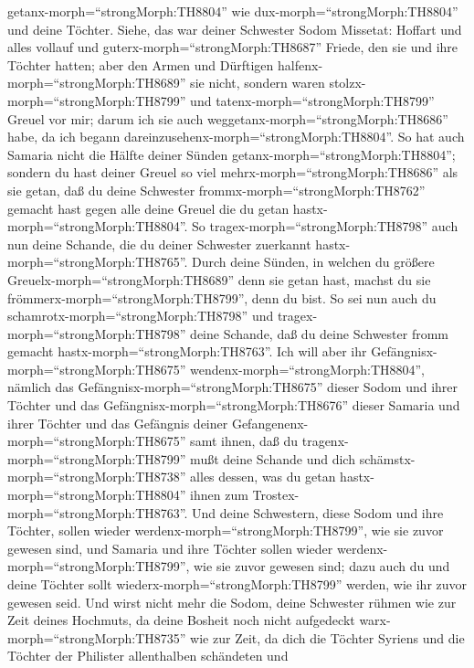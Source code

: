 getanx-morph=``strongMorph:TH8804'' wie dux-morph=``strongMorph:TH8804''
und deine Töchter.  Siehe, das war deiner Schwester Sodom
Missetat: Hoffart und alles vollauf und
guterx-morph=``strongMorph:TH8687'' Friede, den sie und ihre Töchter
hatten; aber den Armen und Dürftigen
halfenx-morph=``strongMorph:TH8689'' sie nicht,  sondern
waren stolzx-morph=``strongMorph:TH8799'' und
tatenx-morph=``strongMorph:TH8799'' Greuel vor mir; darum ich sie auch
weggetanx-morph=``strongMorph:TH8686'' habe, da ich begann
dareinzusehenx-morph=``strongMorph:TH8804''.  So hat auch
Samaria nicht die Hälfte deiner Sünden
getanx-morph=``strongMorph:TH8804''; sondern du hast deiner Greuel so
viel mehrx-morph=``strongMorph:TH8686'' als sie getan, daß du deine
Schwester frommx-morph=``strongMorph:TH8762'' gemacht hast gegen alle
deine Greuel die du getan hastx-morph=``strongMorph:TH8804''.
 So tragex-morph=``strongMorph:TH8798'' auch nun deine
Schande, die du deiner Schwester zuerkannt
hastx-morph=``strongMorph:TH8765''. Durch deine Sünden, in welchen du
größere Greuelx-morph=``strongMorph:TH8689'' denn sie getan hast, machst
du sie frömmerx-morph=``strongMorph:TH8799'', denn du bist. So sei nun
auch du schamrotx-morph=``strongMorph:TH8798'' und
tragex-morph=``strongMorph:TH8798'' deine Schande, daß du deine
Schwester fromm gemacht hastx-morph=``strongMorph:TH8763''.
 Ich will aber ihr Gefängnisx-morph=``strongMorph:TH8675''
wendenx-morph=``strongMorph:TH8804'', nämlich das
Gefängnisx-morph=``strongMorph:TH8675'' dieser Sodom und ihrer Töchter
und das Gefängnisx-morph=``strongMorph:TH8676'' dieser Samaria und ihrer
Töchter und das Gefängnis deiner
Gefangenenx-morph=``strongMorph:TH8675'' samt ihnen,  daß
du tragenx-morph=``strongMorph:TH8799'' mußt deine Schande und dich
schämstx-morph=``strongMorph:TH8738'' alles dessen, was du getan
hastx-morph=``strongMorph:TH8804'' ihnen zum
Trostex-morph=``strongMorph:TH8763''.  Und deine
Schwestern, diese Sodom und ihre Töchter, sollen wieder
werdenx-morph=``strongMorph:TH8799'', wie sie zuvor gewesen sind, und
Samaria und ihre Töchter sollen wieder
werdenx-morph=``strongMorph:TH8799'', wie sie zuvor gewesen sind; dazu
auch du und deine Töchter sollt wiederx-morph=``strongMorph:TH8799''
werden, wie ihr zuvor gewesen seid.  Und wirst nicht mehr
die Sodom, deine Schwester rühmen wie zur Zeit deines Hochmuts,
 da deine Bosheit noch nicht aufgedeckt
warx-morph=``strongMorph:TH8735'' wie zur Zeit, da dich die Töchter
Syriens und die Töchter der Philister allenthalben schändeten und
